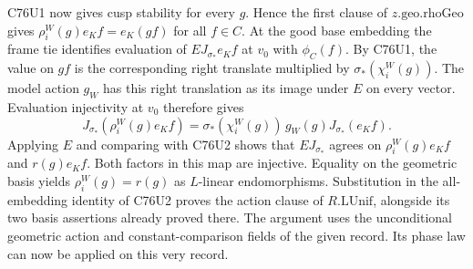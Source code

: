 C76U1 now gives cusp stability for every $g$. Hence the first clause
of $z.\mathrm{geo.rhoGeo}$ gives
$\rho_i^W(g)e_K f=e_K(g f)$ for all $f\in C$. At the good base
embedding the frame tie identifies evaluation of $EJ_{\sigma_*}e_K f$
at $v_0$ with $\phi_C(f)$. By C76U1, the value on $gf$ is the
corresponding right translate multiplied by $\sigma_*(\chi_i^W(g))$.
The model action $g_W$ has this right translation as its image under
$E$ on every vector. Evaluation injectivity at $v_0$ therefore gives
\[
 J_{\sigma_*}(\rho_i^W(g)e_K f)=
  \sigma_*(\chi_i^W(g))\, g_W(g)J_{\sigma_*}(e_K f).
\]
Applying $E$ and comparing with C76U2 shows that $EJ_{\sigma_*}$
agrees on $\rho_i^W(g)e_K f$ and $r(g)e_K f$. Both factors in this
map are injective. Equality on the geometric basis yields
$\rho_i^W(g)=r(g)$ as $L$-linear endomorphisms. Substitution in the
all-embedding identity of C76U2 proves the action clause of
$R.\mathrm{LUnif}$, alongside its two basis assertions already
proved there. The argument uses the unconditional geometric action
and constant-comparison fields of the given record. Its phase law
can now be applied on this very record.
